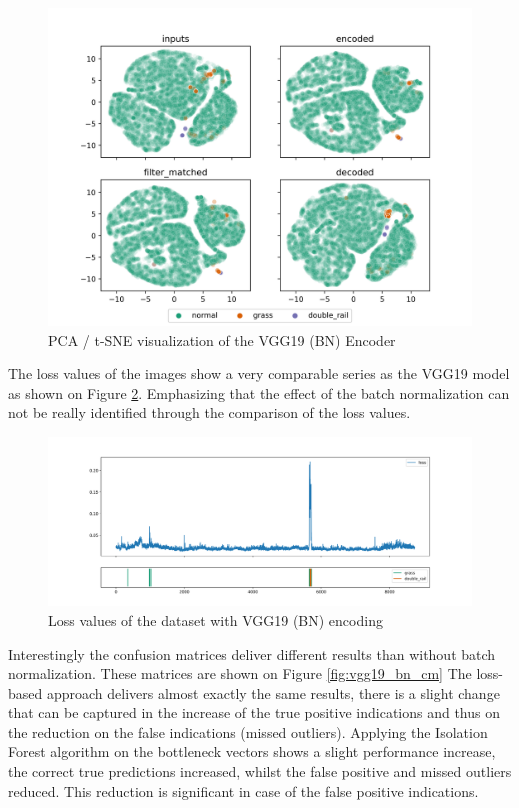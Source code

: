 \begin{figure}[!ht]
    \centering
    \includegraphics[width=\textwidth,trim={0 0 0 1cm},clip]{./results/vgg19_bn_vgg19/20230525_045131_feature_vectors_1.png}
    \caption{PCA / t-SNE visualization of the VGG19 (BN) Encoder}
    \label{fig:vgg19_bn_pca}
\end{figure}

The loss values of the images show a very comparable series as the VGG19 model as shown on Figure
\ref{fig:vgg19_bn_loss}.
Emphasizing that the effect of the batch normalization can not be really identified through the
comparison of the loss values.

\begin{figure}[!ht]
    \centering
    \includegraphics[width=\textwidth]{./results/vgg19_bn_vgg19/20230525_045131_feature_vectors_loss.png}
    \caption{Loss values of the dataset with VGG19 (BN) encoding}
    \label{fig:vgg19_bn_loss}
\end{figure}

Interestingly the confusion matrices deliver different results than without batch normalization.
These matrices are shown on Figure \ref{fig:vgg19_bn_cm}
The loss-based approach delivers almost exactly the same results, there is a slight change that can be
captured in the increase of the true positive indications and thus on the reduction
on the false indications (missed outliers).
Applying the Isolation Forest algorithm on the bottleneck vectors shows a slight performance increase,
the correct true predictions increased, whilst the false positive and missed outliers reduced.
This reduction is significant in case of the false positive indications.

